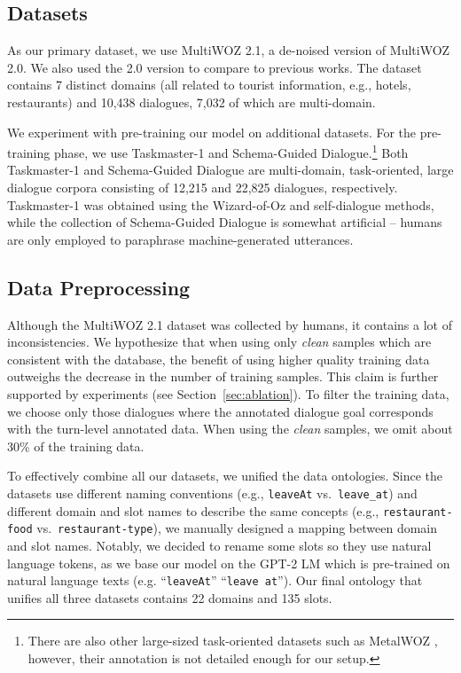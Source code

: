 \documentclass[11pt]{article}
\newcommand{\multiwoz}[0]{MultiWOZ 2.0\xspace}
\newcommand{\multiwozn}[0]{MultiWOZ 2.1\xspace}
\newcommand{\taskmaster}[0]{Taskmaster-1\xspace}
\newcommand{\schema}[0]{Schema-Guided Dialogue\xspace}
\newcommand{\code}[1]{\texttt{#1}}
\begin{document}
\subsection{Datasets}
As our primary dataset, we use \multiwozn, a de-noised version of \multiwoz \cite{budzianowski2018}.
We also used the 2.0 version
to compare to previous works.
The dataset contains 7 distinct domains (all related to tourist information, e.g., hotels, restaurants) and 10,438 dialogues, 7,032 of which are multi-domain.

We experiment with pre-training our model on additional datasets.
For the pre-training phase, we use \taskmaster \cite{byrne2019} and \schema \cite{rastogi2019}.\footnote{There are also other large-sized task-oriented datasets such as MetalWOZ \cite{lee2019multi}, however, 
their annotation is not detailed enough for our setup.}
Both \taskmaster and \schema are multi-domain, task-oriented, large dialogue corpora consisting of 12,215 and 22,825 dialogues, respectively.
\taskmaster was obtained using the Wizard-of-Oz and self-dialogue methods, while the collection of \schema is somewhat artificial -- humans are only employed to paraphrase machine-generated utterances.

\subsection{Data Preprocessing}\label{sec:preprocessing}

Although the MultiWOZ 2.1 dataset was collected by humans, it contains a lot of inconsistencies. We hypothesize that when using only \textit{clean} samples which are consistent with the database, the benefit of using higher quality training data outweighs the decrease in the number of training samples. This claim is further supported by experiments (see Section~\ref{sec:ablation}). To filter the training data, we choose only those dialogues where the annotated dialogue goal corresponds with the turn-level annotated data. When using the \emph{clean} samples, we omit about 30\% of the training data.


To effectively combine all our datasets, we unified the data ontologies.
Since the datasets use different naming conventions (e.g., \code{leaveAt} vs.\ \code{leave\_at}) and different domain and slot names to 
describe the same concepts (e.g., \code{restaurant-food} vs.\ \code{restaurant-type}),
we manually designed a mapping between domain and slot names. Notably, we decided to rename some slots so they use natural language tokens, as we base our model on the GPT-2 LM which is pre-trained on natural language texts (e.g. ``\code{leaveAt}''  ``\code{leave at}'').
Our final ontology that unifies all three datasets contains 22 domains and 135 slots.
\end{document}
